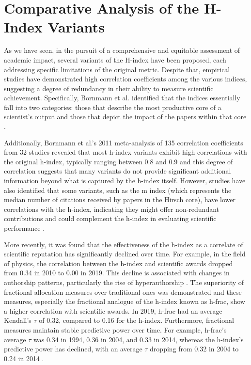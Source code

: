 \section{Comparative Analysis of the H-Index Variants}
As we have seen, in the pursuit of a comprehensive and equitable assessment of
academic impact, several variants of the H-index have been proposed, each
addressing specific limitations of the original metric. Despite that, empirical
studies have demonstrated high correlation coefficients among the various
indices, suggesting a degree of redundancy in their ability to measure
scientific achievement. Specifically, Bornmann et al. identified that the
indices essentially fall into two categories: those that describe the most
productive core of a scientist’s output and those that depict the impact of the
papers within that core \cite{bornmann2008are, bornmann2011multilevel}.

Additionally, Bornmann et al.'s 2011 meta-analysis of 135 correlation
coefficients from 32 studies revealed that most h-index variants exhibit high
correlations with the original h-index, typically ranging between 0.8 and 0.9
and this degree of correlation suggests that many variants do not provide
significant additional information beyond what is captured by the h-index
itself. However, studies have also identified that some variants, such as the m
index (which represents the median number of citations received by papers in
the Hirsch core), have lower correlations with the h-index, indicating they
might offer non-redundant contributions and could complement the h-index in
evaluating scientific performance \cite{bornmann2011multilevel, bornmann2008are}.

More recently, it was found that the effectiveness of the h-index as a
correlate of scientific reputation has significantly declined over time. For
example, in the field of physics, the correlation between the h-index and
scientific awards dropped from 0.34 in 2010 to 0.00 in 2019. This decline is
associated with changes in authorship patterns, particularly the rise of
hyperauthorship \cite{koltun2021h}. The superiority of fractional allocation
measures over traditional ones was demonstrated and these measures, especially
the fractional analogue of the h-index known as h-frac, show a higher
correlation with scientific awards. In 2019, h-frac had an average Kendall’s
$\tau$ of 0.32, compared to 0.16 for the h-index. Furthermore, fractional
measures maintain stable predictive power over time. For example, h-frac's
average $\tau$ was 0.34 in 1994, 0.36 in 2004, and 0.33 in 2014, whereas the
h-index's predictive power has declined, with an average $\tau$ dropping from
0.32 in 2004 to 0.24 in 2014 \cite{koltun2021h}.

